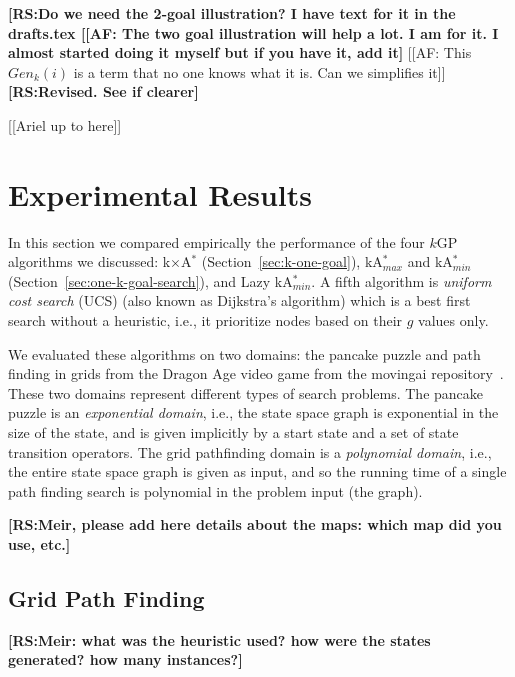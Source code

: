 \documentclass{aicom2e}
\newcommand{\kgs}{$k$GP}
\newcommand{\astar}{A$^*$}
\newcommand{\kastar}{kA$^*$}
\newcommand{\kastarmin}{kA$^*_{min}$}
\newcommand{\kastarmax}{kA$^*_{max}$}
\newcommand{\kxastar}{k$\times$A$^*$}
\newcommand{\minf}{$F_{min}(n)$}
\newcommand{\roni}[1]{\textbf{[RS:#1]}}
\begin{document}
\roni{Do we need the 2-goal illustration? I have text for it in the drafts.tex
[[AF: The two goal illustration will help a lot. I am for it. I almost started
doing it myself but if you have it, add it}
[[AF: This  $Gen_k(i)$ is a term that no one knows what it is. Can we
simplifies it]]
\roni{Revised. See if clearer}

[[Ariel up to here]]

\section{Experimental Results}


In this section we compared empirically the performance of the four \kgs{}
algorithms we discussed: \kxastar{} (Section~\ref{sec:k-one-goal}),
\kastarmax{} and \kastarmin{}(Section~\ref{sec:one-k-goal-search}), and Lazy
\kastarmin{}. A fifth algorithm is {\em uniform cost search} (UCS) (also known
as Dijkstra's algorithm) which is a best first search without a heuristic,
i.e., it prioritize nodes based on their $g$ values only.


We evaluated these algorithms on two domains: the pancake puzzle and path
finding in grids from the Dragon Age video game from the movingai
repository~\cite{sturtevant2012benchmarks}. These two domains represent
different types of search problems. The pancake puzzle is an {\em exponential
domain}, i.e., the state space graph is exponential in the size of the state,
and is given implicitly by a start state and a set of state transition
operators. The grid pathfinding domain is a {\em polynomial domain}, i.e., the
entire state space graph is given as input, and so the running time of a single
path finding search is polynomial in the problem input (the graph).

\roni{Meir, please add here details about the maps: which map did you use, etc.}
\subsection{Grid Path Finding}
\roni{Meir: what was the heuristic used? how were the states generated? how many instances?}
\end{document}
